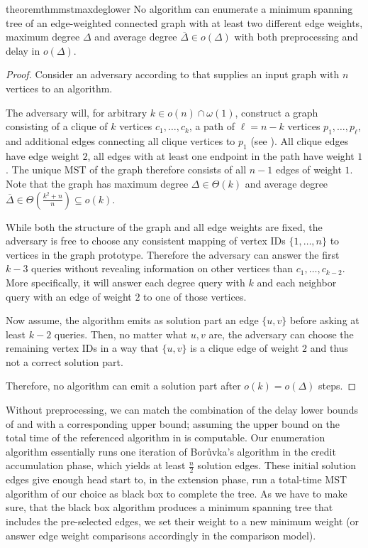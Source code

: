 \documentclass[a4paper, USenglish, cleveref, autoref, thm-restate]{lipics-v2021}
\newcommand{\maxdeg}{\Delta}
\newcommand{\avgdeg}{\overline{\Delta}}
\begin{document}
\begin{restatable}{theorem}{thmmstmaxdeglower}
	\label{thm:mst-maxdeg-lower}
	No algorithm can enumerate a minimum spanning tree of an edge-weighted connected graph with at least two different edge weights, maximum degree $\maxdeg$ and average degree $\avgdeg \in o(\maxdeg)$ with both preprocessing and delay in $o(\maxdeg)$.
\end{restatable}
\begin{proof}
	Consider an adversary according to  that supplies an input graph with $n$ vertices to an algorithm.
	
	The adversary will, for arbitrary $k \in o(n) \cap \omega(1)$, construct a graph consisting of a clique of $k$  vertices $c_1, \ldots, c_k$, a path of $\ell = n - k$ vertices $p_1, \ldots, p_\ell$, and additional edges connecting all clique vertices to $p_1$ (see ).
	All clique edges have edge weight $2$, all edges with at least one endpoint in the path have weight $1$.
	The unique MST of the graph therefore consists of all $n-1$ edges of weight $1$.
	Note that the graph has maximum degree $\maxdeg \in \Theta(k)$ and average degree $\avgdeg \in \Theta(\frac{k^2 + n}{n}) \subseteq o(k)$.
	
	
	
	While both the structure of the graph and all edge weights are fixed, the adversary is free to choose any consistent mapping of vertex IDs $\{1, \ldots, n\}$ to vertices in the graph prototype.
	Therefore the adversary can answer the first $k-3$ queries without revealing information on other vertices than $c_1, \ldots, c_{k-2}$.
	More specifically, it will answer each degree query with $k$ and each neighbor query with an edge of weight $2$ to one of those vertices.
	
	Now assume, the algorithm emits as solution part an edge $\{u,v\}$ before asking at least $k-2$ queries.
	Then, no matter what $u,v$ are, the adversary can choose the remaining vertex IDs in a way that $\{u,v\}$ is a clique edge of weight $2$ and thus not a correct solution part.
	
	Therefore, no algorithm can emit a solution part after $o(k) = o(\maxdeg)$ steps.
\end{proof}

Without preprocessing, we can match the combination of the delay lower bounds of  and  with a corresponding upper bound;
assuming the upper bound on the total time of the referenced algorithm in  is computable.
Our enumeration algorithm essentially runs one iteration of Borůvka's algorithm \cite{boruvkaJistemProblemuMinimalnim1926} in the credit accumulation phase, which yields at least $\frac{n}{2}$ solution edges.
These initial solution edges give enough head start to, in the extension phase, run a total-time MST algorithm of our choice as black box to complete the tree.
As we have to make sure, that the black box algorithm produces a minimum spanning tree that includes the pre-selected edges, we set their weight to a new minimum weight (or answer edge weight comparisons accordingly in the comparison model).
\end{document}
